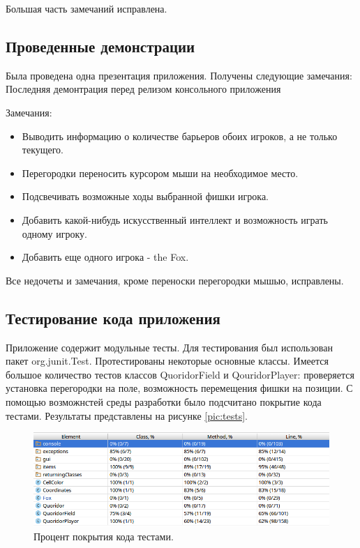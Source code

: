 \documentclass[a4paper]{article}
\begin{document}
Большая часть замечаний исправлена. 

\subsection{Проведенные демонстрации}
Была проведена одна презентация приложения. Получены следующие замечания:
Последняя демонтрация перед релизом консольного приложения

Замечания:

\begin{itemize}
\item Выводить информацию о количестве барьеров обоих игроков, а не только текущего.
\item Перегородки переносить курсором мыши на необходимое место.
\item Подсвечивать возможные ходы выбранной фишки игрока.
\item Добавить какой-нибудь искусственный интеллект и возможность играть одному игроку. 
\item Добавить еще одного игрока - the Fox.
\end{itemize}

Все недочеты и замечания, кроме переноски перегородки мышью, исправлены.

\subsection{Тестирование кода приложения}
Приложение содержит модульные тесты. Для тестирования был использован пакет org.junit.Test. Протестированы некоторые основные классы. Имеется большое количество тестов классов QuoridorField и QouridorPlayer: проверяется установка перегородки на поле, возможность перемещения фишки на позиции. С помощью возможнстей среды разработки было подсчитано  покрытие кода тестами. Результаты представлены на рисунке \ref{pic:tests}. 

\begin{figure}[H]
	\begin{center}
		\includegraphics[scale=0.5]{tests}
		\caption{Процент покрытия кода тестами.} 
		\label{pic:gameGUI3} %
	\end{center}
\end{figure}
\end{document}
